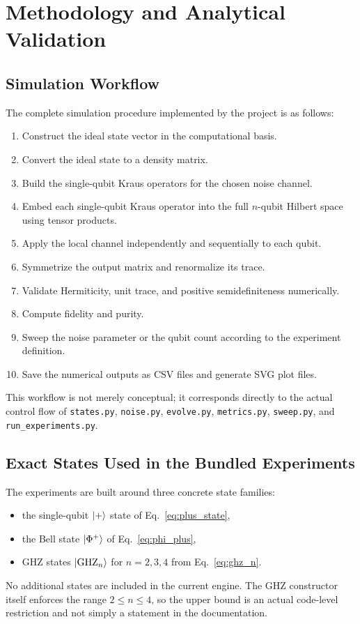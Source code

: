 \chapter{Methodology and Analytical Validation}

\section{Simulation Workflow}

The complete simulation procedure implemented by the project is as follows:
\begin{enumerate}
\item Construct the ideal state vector in the computational basis.
\item Convert the ideal state to a density matrix.
\item Build the single-qubit Kraus operators for the chosen noise channel.
\item Embed each single-qubit Kraus operator into the full $n$-qubit Hilbert space using tensor products.
\item Apply the local channel independently and sequentially to each qubit.
\item Symmetrize the output matrix and renormalize its trace.
\item Validate Hermiticity, unit trace, and positive semidefiniteness numerically.
\item Compute fidelity and purity.
\item Sweep the noise parameter or the qubit count according to the experiment definition.
\item Save the numerical outputs as CSV files and generate SVG plot files.
\end{enumerate}

This workflow is not merely conceptual; it corresponds directly to the actual control flow of \texttt{states.py}, \texttt{noise.py}, \texttt{evolve.py}, \texttt{metrics.py}, \texttt{sweep.py}, and \texttt{run\_experiments.py}.

\section{Exact States Used in the Bundled Experiments}

The experiments are built around three concrete state families:
\begin{itemize}
\item the single-qubit $\lvert + \rangle$ state of Eq.~\eqref{eq:plus_state},
\item the Bell state $\lvert \Phi^+ \rangle$ of Eq.~\eqref{eq:phi_plus},
\item GHZ states $\lvert \mathrm{GHZ}_n \rangle$ for $n=2,3,4$ from Eq.~\eqref{eq:ghz_n}.
\end{itemize}
No additional states are included in the current engine. The GHZ constructor itself enforces the range $2 \le n \le 4$, so the upper bound is an actual code-level restriction and not simply a statement in the documentation.

